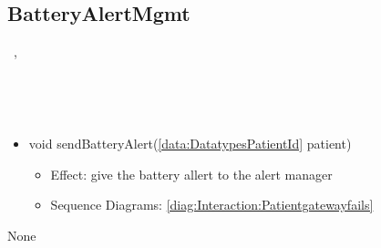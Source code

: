   \subsection{BatteryAlertMgmt}\label{int:InterfacesBatteryAlertMgmt}
    \begin{description}
      \item[Provided by:] \iconcomponent{}~, \iconcomponent{}~
      \item[Required by:] \iconcomponent{}~ 
      \item[Operations:] ~
    \begin{itemize}[noitemsep,nolistsep,leftmargin=-.25cm]
      \item \textsf{void sendBatteryAlert(\ref{data:DatatypesPatientId} patient)}
        \begin{itemize}[noitemsep,nolistsep]
           \item Effect: give the battery allert to the alert manager
 
           \item Sequence Diagrams: \cref{diag:Interaction:Patientgatewayfails}
        \end{itemize}
    \end{itemize}
      \item[Diagrams:] None
    \end{description}


